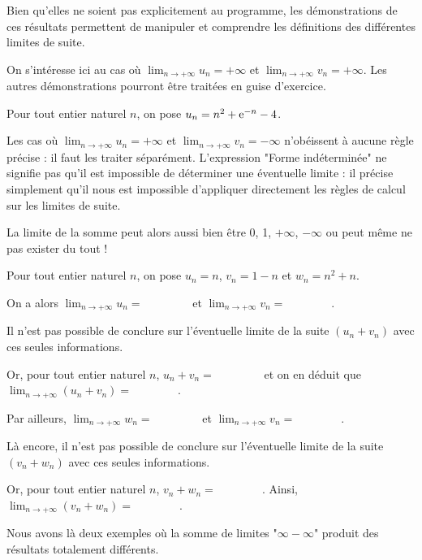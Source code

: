 \documentclass[11pt,fleqn]{book} %
\begin{document}
\begin{demonstration}Bien qu'elles ne soient pas explicitement au programme, les démonstrations de ces résultats permettent de manipuler et comprendre les définitions des différentes limites de suite. 

On s'intéresse ici au cas où $\displaystyle\lim_{n \to + \infty}u_n=+\infty$ et $\displaystyle \lim_{n \to+\infty}v_n=+\infty$. Les autres démonstrations pourront être traitées en guise d'exercice.

\vskip110pt

\end{demonstration}

\begin{example}Pour tout entier naturel $n$, on pose $u_n=n^2+\mathrm{e}^{-n}-4$. 

\vskip30pt \end{example}

Les cas où $\displaystyle \lim_{n \to +\infty} u_n = +\infty$ et $\displaystyle \lim_{n \to +\infty} v_n = -\infty$ n'obéissent à aucune règle précise : il faut les traiter séparément. L'expression "Forme indéterminée" ne signifie pas qu'il est impossible de déterminer une éventuelle limite : il précise simplement qu'il nous est impossible d'appliquer directement les règles de calcul sur les limites de suite. 

La limite de la somme peut alors aussi bien être 0, 1, $+\infty$, $-\infty$ ou peut même ne pas exister du tout !

\begin{example} Pour tout entier naturel $n$, on pose $u_n = n$, $v_n = 1-n$ et $w_n=n^2+n$.

On a alors $\displaystyle \lim_{n \to +\infty} u_n = \qquad\qquad$ et $\displaystyle \lim_{n \to +\infty} v_n = \qquad\qquad$. 

Il n'est pas possible de conclure sur l'éventuelle limite de la suite $(u_n+v_n)$ avec ces seules informations.

Or, pour tout entier naturel $n$, $u_n+v_n=\qquad\qquad$ et on en déduit que $\displaystyle \lim_{n \to +\infty} (u_n+v_n) = \qquad\qquad$.

Par ailleurs, $\displaystyle \lim_{n \to +\infty} w_n = \qquad\qquad$ et $\displaystyle \lim_{n \to +\infty} v_n = \qquad\qquad$. 

Là encore, il n'est pas possible de conclure sur l'éventuelle limite de la suite $(v_n+w_n)$ avec ces seules informations.

Or, pour tout entier naturel $n$, $v_n+w_n=\qquad\qquad$. Ainsi, $\displaystyle \lim_{n \to +\infty} (v_n+w_n) = \qquad\qquad$. 

Nous avons là deux exemples où la somme de limites "$\infty - \infty $" produit des résultats totalement différents.\end{example}
\end{document}
